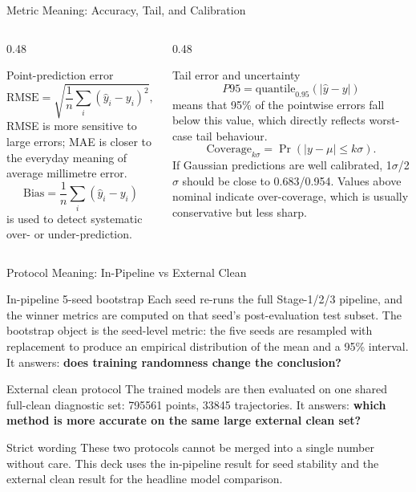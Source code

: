 \documentclass[aspectratio=169,11pt]{beamer}
\begin{document}
\begin{frame}{Metric Meaning: Accuracy, Tail, and Calibration}
\small
\begin{columns}[T,onlytextwidth]
\begin{column}{0.48\linewidth}
\begin{block}{Point-prediction error}
\footnotesize
\[
\mathrm{RMSE}=\sqrt{\frac{1}{n}\sum_i(\hat y_i-y_i)^2},
\quad
\mathrm{MAE}=\frac{1}{n}\sum_i|\hat y_i-y_i|.
\]
RMSE is more sensitive to large errors; MAE is closer to the everyday meaning of average millimetre error.
\[
\mathrm{Bias}=\frac{1}{n}\sum_i(\hat y_i-y_i)
\]
is used to detect systematic over- or under-prediction.
\end{block}
\end{column}

\begin{column}{0.48\linewidth}
\begin{block}{Tail error and uncertainty}
\footnotesize
\[
P95=\mathrm{quantile}_{0.95}(|\hat y-y|)
\]
means that 95\% of the pointwise errors fall below this value, which directly reflects worst-case tail behaviour.
\[
\mathrm{Coverage}_{k\sigma}
=\Pr(|y-\mu|\leq k\sigma).
\]
If Gaussian predictions are well calibrated, 1\(\sigma\)/2\(\sigma\) should be close to
0.683/0.954. Values above nominal indicate over-coverage, which is usually conservative but less sharp.
\end{block}
\end{column}
\end{columns}
\end{frame}

\begin{frame}{Protocol Meaning: In-Pipeline vs External Clean}
\small
\begin{block}{In-pipeline 5-seed bootstrap}
\footnotesize
Each seed re-runs the full Stage-1/2/3 pipeline, and the winner metrics are computed on that seed's post-evaluation
test subset. The bootstrap object is the seed-level metric: the five seeds are resampled with replacement to produce
an empirical distribution of the mean and a 95\% interval.
It answers: \textbf{does training randomness change the conclusion?}
\end{block}

\begin{block}{External clean protocol}
\footnotesize
The trained models are then evaluated on one shared full-clean diagnostic set:
\num{795561} points, \num{33845} trajectories. It answers:
\textbf{which method is more accurate on the same large external clean set?}
\end{block}

\begin{block}{Strict wording}
\footnotesize
These two protocols cannot be merged into a single number without care. This deck uses the in-pipeline result for seed
stability and the external clean result for the headline model comparison.
\end{block}
\end{frame}
\end{document}
